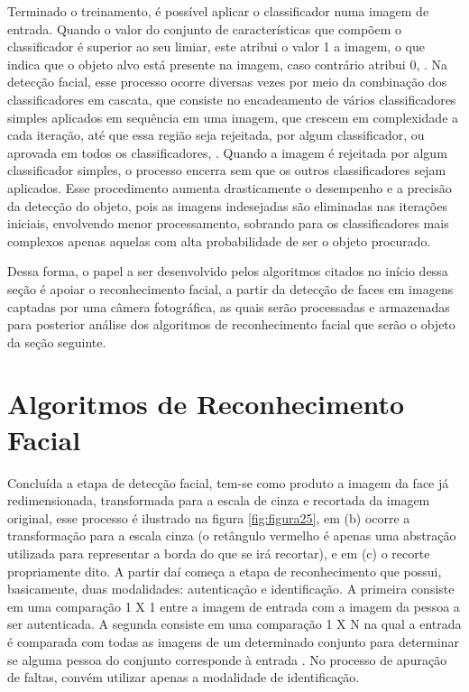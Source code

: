 Terminado o treinamento, é possível aplicar o classificador numa imagem de entrada. Quando o valor do conjunto de características que compõem o classificador é superior ao seu limiar, este atribui o valor 1 a imagem, o que indica que o objeto alvo está presente na imagem, caso contrário atribui 0, \citep{open2018}. Na detecção facial, esse processo ocorre diversas vezes por meio da combinação dos classificadores em cascata, que consiste no encadeamento de vários classificadores simples aplicados em sequência em uma imagem, que crescem em complexidade a cada iteração,  até que essa região seja rejeitada, por algum classificador, ou aprovada em todos os classificadores, \citep{open2018}. Quando a imagem é rejeitada por algum classificador simples, o processo encerra sem que os outros classificadores sejam aplicados. Esse procedimento aumenta drasticamente o desempenho e a precisão da detecção do objeto, pois as imagens indesejadas são eliminadas nas iterações iniciais, envolvendo menor processamento, sobrando para os classificadores mais complexos apenas aquelas com alta probabilidade de ser o objeto procurado.

Dessa forma, o papel a ser desenvolvido pelos algoritmos citados no início dessa seção é apoiar o reconhecimento facial, a partir da detecção de faces em imagens captadas por uma câmera fotográfica, as quais serão processadas e armazenadas para posterior análise dos algoritmos de reconhecimento facial que serão o objeto da seção seguinte.
\newpage
\section{Algoritmos de Reconhecimento Facial}
\noindent
Concluída a etapa de detecção facial, tem-se como produto a imagem da face já redimensionada, transformada para a escala de cinza e recortada da imagem original, esse processo é ilustrado na figura \ref{fig:figura25}, em (b) ocorre a transformação para a escala cinza (o retângulo vermelho é apenas uma abstração utilizada para representar a borda do que se irá recortar), e em (c) o recorte propriamente dito. A partir daí começa a etapa de reconhecimento que possui, basicamente, duas modalidades: autenticação e identificação. A primeira consiste em uma comparação 1 X 1 entre a imagem de entrada com a imagem da pessoa a ser autenticada. A segunda consiste em uma comparação 1 X N na qual a entrada é comparada com todas as imagens de um determinado conjunto para determinar se alguma pessoa do conjunto corresponde à entrada \citep{tdc2018}. No processo de apuração de faltas, convém utilizar apenas a modalidade de identificação.

